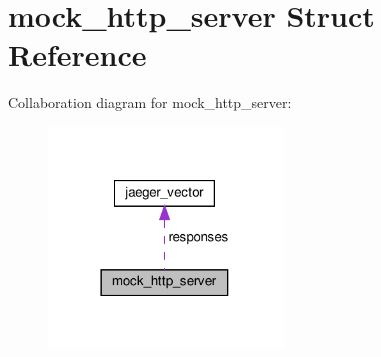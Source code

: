 \hypertarget{structmock__http__server}{}\section{mock\+\_\+http\+\_\+server Struct Reference}
\label{structmock__http__server}


Collaboration diagram for mock\+\_\+http\+\_\+server\+:\nopagebreak
\begin{figure}[H]
\begin{center}
\leavevmode
\includegraphics[width=177pt]{structmock__http__server__coll__graph}
\end{center}
\end{figure}
